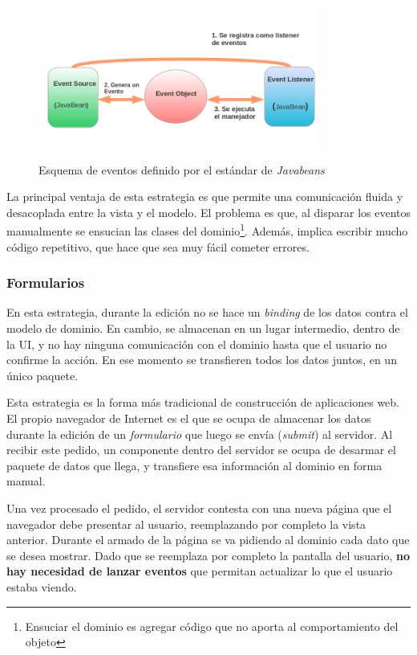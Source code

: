 	 \begin{figure}[h]
	 	\centering
		\includegraphics[width=350px, height=200px]{img/javabeans}
		\caption{Esquema de eventos definido por el estándar de \emph{Javabeans}}
		\label{javabeans}
	\end{figure}

	La principal ventaja de esta estrategia es que
	permite una comunicación fluida y desacoplada entre la vista y el modelo.
	El problema es que, al disparar los eventos
	manualmente se ensucian las clases del dominio\footnote{Ensuciar el dominio es
	agregar código que no aporta al comportamiento del objeto}. Además, implica
	escribir mucho código repetitivo, que hace que sea muy fácil cometer errores.

\subsubsection{Formularios}

	En esta estrategia, durante la edición no se hace un \emph{binding} de los
	datos contra el modelo de dominio. En cambio, se almacenan en un lugar
	intermedio, dentro de la UI, y no hay ninguna comunicación
	con el dominio hasta que el usuario no confirme la acción. En ese momento se
	transfieren todos los datos juntos, en un único paquete.
	
	Esta estrategia es la forma más tradicional de construcción de aplicaciones
	web. El propio navegador de Internet es el que se ocupa de almacenar los
	datos durante la edición de un \emph{formulario} que luego se envía
	(\emph{submit}) al servidor. 
	Al recibir este pedido, un componente dentro del servidor se ocupa de desarmar
	el paquete de datos que llega, y transfiere esa información al dominio en forma
	manual.
	
	Una vez procesado el pedido, el servidor contesta con una nueva página que
	el navegador debe presentar al usuario, reemplazando por completo la vista
	anterior.
	Durante el armado de la página se va pidiendo al dominio cada dato que se desea
	mostrar. Dado que se reemplaza por completo la pantalla del usuario, \textbf{no
	hay necesidad de lanzar eventos} que permitan actualizar lo que el usuario
	estaba viendo.
	
